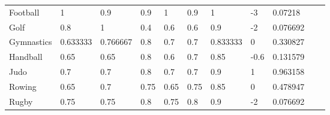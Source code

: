 \documentclass[a4paper]{article}
\begin{document}
\begin{table}[h]
\begin{tabular}{|l|lllllll|l|ll}
    Football                                    & \multicolumn{1}{l|}{1}        & \multicolumn{1}{l|}{0.9}      & \multicolumn{1}{l|}{0.9}  & \multicolumn{1}{l|}{1}    & \multicolumn{1}{l|}{0.9}  & \multicolumn{1}{l|}{1}        & -3                      & 0.07218                                                &  &  \\ \cline{1-9}
    Golf                                        & \multicolumn{1}{l|}{0.8}      & \multicolumn{1}{l|}{1}        & \multicolumn{1}{l|}{0.4}  & \multicolumn{1}{l|}{0.6}  & \multicolumn{1}{l|}{0.6}  & \multicolumn{1}{l|}{0.9}      & -2                      & 0.076692                                               &  &  \\ \cline{1-9}
    Gymnastics                                  & \multicolumn{1}{l|}{0.633333} & \multicolumn{1}{l|}{0.766667} & \multicolumn{1}{l|}{0.8}  & \multicolumn{1}{l|}{0.7}  & \multicolumn{1}{l|}{0.7}  & \multicolumn{1}{l|}{0.833333} & 0                       & 0.330827                                               &  &  \\ \cline{1-9}
    Handball                                    & \multicolumn{1}{l|}{0.65}     & \multicolumn{1}{l|}{0.65}     & \multicolumn{1}{l|}{0.8}  & \multicolumn{1}{l|}{0.6}  & \multicolumn{1}{l|}{0.7}  & \multicolumn{1}{l|}{0.85}     & -0.6                    & 0.131579                                               &  &  \\ \cline{1-9}
    Judo                                        & \multicolumn{1}{l|}{0.7}      & \multicolumn{1}{l|}{0.7}      & \multicolumn{1}{l|}{0.8}  & \multicolumn{1}{l|}{0.7}  & \multicolumn{1}{l|}{0.7}  & \multicolumn{1}{l|}{0.9}      & 1                       & 0.963158                                               &  &  \\ \cline{1-9}
    Rowing                                      & \multicolumn{1}{l|}{0.65}     & \multicolumn{1}{l|}{0.7}      & \multicolumn{1}{l|}{0.75} & \multicolumn{1}{l|}{0.65} & \multicolumn{1}{l|}{0.75} & \multicolumn{1}{l|}{0.85}     & 0                       & 0.478947                                               &  &  \\ \cline{1-9}
    Rugby                                       & \multicolumn{1}{l|}{0.75}     & \multicolumn{1}{l|}{0.75}     & \multicolumn{1}{l|}{0.8}  & \multicolumn{1}{l|}{0.75} & \multicolumn{1}{l|}{0.8}  & \multicolumn{1}{l|}{0.9}      & -2                      & 0.076692                                               &  &  \\ \cline{1-9}

\end{tabular}
\end{table}
\end{document}
